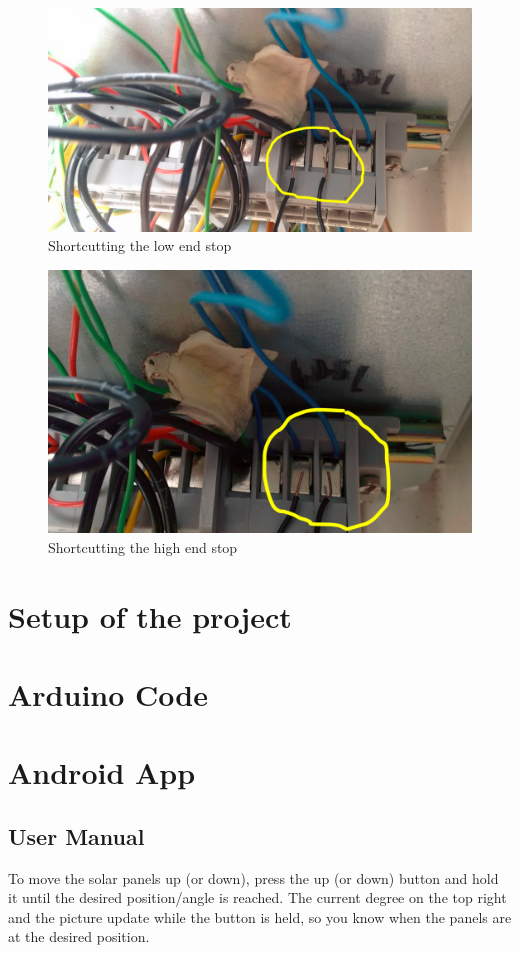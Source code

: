 \documentclass{article}
\begin{document}
    \begin{figure}
        \centering
        \includegraphics[width=.8\linewidth]{images/lowendstop.PNG}
        \caption{Shortcutting the low end stop}
        \label{lowendstop}
    \end{figure}
    \begin{figure}
        \centering
        \includegraphics[width=.8\linewidth]{images/highendstop.PNG}
        \caption{Shortcutting the high end stop}
        \label{highendstop}
    \end{figure}

    \section{Setup of the project}\label{sec:setupOfTheProject}
    

    \section{Arduino Code}\label{sec:arduinoCode}
    

    \section{Android App}\label{sec:androidApp}
    \subsection{User Manual}\label{subsec:userManual}
    To move the solar panels up (or down), press the up (or down) button and hold it until the desired position/angle is reached.
    The current degree on the top right and the picture update while the button is held, so you know when the panels are at the desired position.
\end{document}
